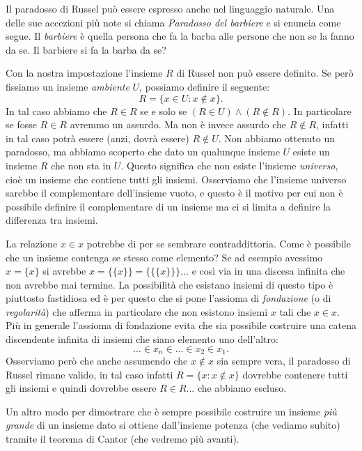 \documentclass[italian,a4paper,hidelinks,headinclude]{scrartcl}
\newcommand{\myemph}[1]{\emph{#1}\marginpar{#1}}
\begin{document}
Il paradosso di Russel può essere espresso anche nel linguaggio naturale.
Una delle sue accezioni più note si chiama \emph{Paradosso del barbiere}
e si enuncia come segue. Il \emph{barbiere} è quella persona che fa la barba
alle persone che non se la fanno da se. Il barbiere si fa la barba da se?

Con la nostra impostazione l'insieme $R$ di Russel non può essere definito.
Se però fissiamo un insieme \emph{ambiente} $U$, possiamo definire il seguente:
\[
  R = \{ x \in U \colon x \not \in x\}.
\]
In tal caso abbiamo che $R\in R$ se e solo se $(R\in U) \land (R \not \in R)$.
In particolare se fosse $R\in R$ avremmo un assurdo. Ma non è invece
assurdo che $R\not \in R$, infatti in tal caso potrà essere (anzi, dovrà essere)
$R\not \in U$.
Non abbiamo ottenuto un paradosso, ma abbiamo scoperto che dato
un qualunque insieme $U$ esiste un insieme $R$ che non sta in $U$.
Questo significa che non esiste l'insieme \myemph{universo}, cioè un insieme che
contiene tutti gli insiemi. Osserviamo che l'insieme universo sarebbe il complementare
dell'insieme vuoto, e questo è il motivo per cui non è possibile definire
il complementare di un insieme ma ci si limita a definire la differenza tra insiemi.

La relazione $x\in x$ potrebbe di per se sembrare contraddittoria.
Come è possibile che un insieme contenga se stesso come elemento?
Se ad esempio avessimo $x=\{ x\}$ si avrebbe $x=\{\{x\}\} = \{\{\{ x\}\}\} \dots$
e così via in una discesa infinita che non avrebbe mai termine.
La possibilità che esistano insiemi di questo tipo è piuttosto fastidiosa ed è per questo
che si pone l'assioma di \emph{fondazione} (o di \emph{regolarità}) che afferma
in particolare che non esistono insiemi $x$ tali che $x\in x$.
Più in generale l'assioma di fondazione evita che sia possibile
costruire una catena discendente infinita di insiemi che siano
elemento uno dell'altro:
\[
  \dots \in x_n \in \dots \in x_2 \in x_1.
\]
Osserviamo però che anche assumendo che $x\not\in x$ sia sempre vera,
il paradosso di Russel rimane valido, in tal caso infatti
$R=\{x\colon x\not \in x\}$ dovrebbe contenere
tutti gli insiemi e quindi dovrebbe essere $R\in R$... che abbiamo escluso.

Un altro modo per dimostrare che è sempre possibile costruire un
insieme \emph{più grande} di un insieme dato si ottiene dall'insieme potenza
(che vediamo subito) tramite il teorema di Cantor (che vedremo più avanti).
\end{document}
